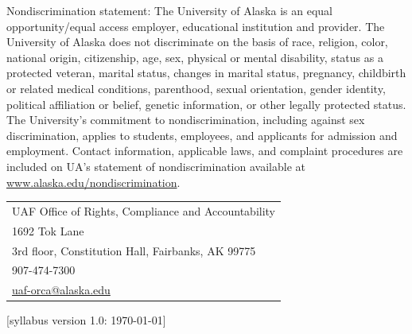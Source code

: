 \documentclass[12pt]{article}
\begin{document}
Nondiscrimination statement: The University of Alaska is an equal opportunity/equal access employer, educational institution and provider. The University of Alaska does not discriminate on the basis of race, religion, color, national origin, citizenship, age, sex, physical or mental disability, status as a protected veteran, marital status, changes in marital status, pregnancy, childbirth or related medical conditions, parenthood, sexual orientation, gender identity, political affiliation or belief, genetic information, or other legally protected status. The University's commitment to nondiscrimination, including against sex discrimination, applies to students, employees, and applicants for admission and employment. Contact information, applicable laws, and complaint procedures are included on UA's statement of nondiscrimination available at \url{www.alaska.edu/nondiscrimination}.

\begin{tabular}{l}
UAF Office of Rights, Compliance and Accountability\\
1692 Tok Lane\\
3rd floor, Constitution Hall, Fairbanks, AK 99775\\
907-474-7300\\
\url{uaf-orca@alaska.edu}
\end{tabular}

\hfill  \scriptsize [syllabus version 1.0: \today] \normalsize
\end{document}
